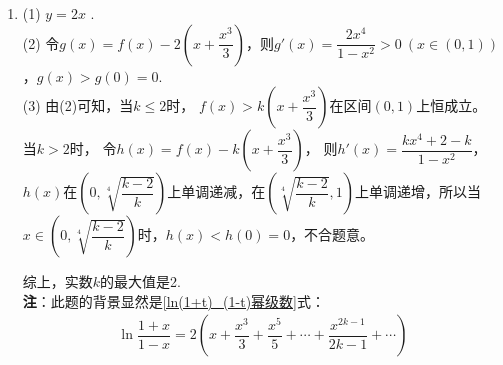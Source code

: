 \begin{enumerate}[label={\textbf{\thechapter.\arabic*}},leftmargin=
    \inteval{\myenumleftmargin}pt]
必须有$ h(1)=8-K\geq 0,\ K\leq 8 $，否则，若$ K>8 $，则$ \Delta=K^2-60>0 $，
$ g(x) $在$ \left[1,\dfrac{K+\sqrt{K^2-60}}{10}\right] $上单调递减，
$ g(x)<g(1)=0 $，不合题意。当$ K=8 $时，$ h(x) $在区间
$ \left(\dfrac{4}{5},+\infty\right) $上单调递增，$ h(x)\geq h(1)=0 $，
$ g'(x)=\dfrac{h(x)}{x^2}\geq 0 $，$ g(x)\geq g(1)=0 $.

所以，$ K $的最大值是8.

\item (1) $ y=2x $ .\\
(2) 令$ g(x)=f(x)-2\left(x+\dfrac{x^{3}}{3}\right) $，则$ g'(x)=
\dfrac{2x^4}{1-x^2}>0\ (x\in(0,1)) $，$ g(x)>g(0)=0 $. \\
(3)  由(2)可知，当$ k\leq 2 $时， $ f(x)>k\left(x+
\dfrac{x^{3}}{3}\right) $在区间$ (0,1) $上恒成立。
当$ k>2 $时， 令$ h(x)=f(x)-k\left(x+\dfrac{x^{3}}{3}\right) $，
则$ h'(x)=\dfrac{k x^{4}+2-k}{1-x^{2}} $，
$ h(x) $在$ \left(0,\sqrt[4]{\dfrac{k-2}{k}}
\right) $上单调递减，在$ \left(\sqrt[4]{\dfrac{k-2}{k}},
1\right) $上单调递增，所以当 $ x\in\left(0,\sqrt[4]{\dfrac{k-2}{k}}
\right) $时，$ h(x)<h(0)=0 $，不合题意。

综上，实数$ k $的最大值是2. \\
\textbf{注}：此题的背景显然是\eqref{ln(1+t)_(1-t)幂级数}式：
\begin{align*}
    \ln\dfrac{1+x}{1-x}=2\left(x+\dfrac{x^3}{3}+\dfrac{x^5}{5}+\cdots +\dfrac{x^{2k-1}}{2k-1} +\cdots \right)
\end{align*}


\end{enumerate}
